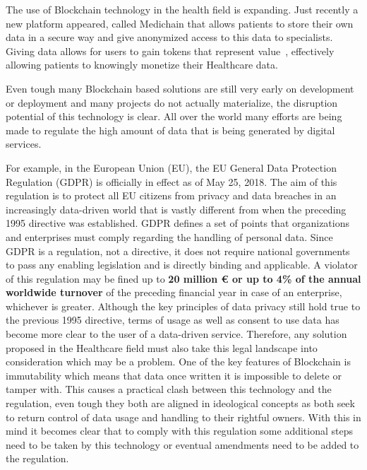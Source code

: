 The use of Blockchain technology in the health field is expanding. Just
recently a new platform appeared, called Medichain that allows patients to
store their own data in a secure way and give anonymized access to this data to
specialists. Giving data allows for users to gain tokens that represent
value~\cite{MediChain2018}, effectively allowing patients to knowingly monetize
their Healthcare data.

Even tough many Blockchain based solutions are still very early on development
or deployment and many projects do not actually materialize, the disruption
potential of this technology is clear. All over the world many efforts are
being made to regulate the high amount of data that is being generated by
digital services.

For example, in the European Union (EU), the EU General Data Protection
Regulation (GDPR) is officially in effect as of May 25, 2018. The aim of this
regulation is to protect all EU citizens from privacy and data breaches in an
increasingly data-driven world that is vastly different from when the preceding
1995 directive was established. GDPR defines a set of points that organizations
and enterprises must comply regarding the handling of personal data. Since GDPR
is a regulation, not a directive, it does not require national governments to
pass any enabling legislation and is directly binding and applicable. A
violator of this regulation may be fined up to \textbf{20 million € or up to
	4\% of the annual worldwide turnover} of the preceding financial year in case
of an enterprise, whichever is greater. Although the key principles of data
privacy still hold true to the previous 1995 directive, terms of usage as well
as consent to use data has become more clear to the user of a data-driven
service.  Therefore, any solution proposed in the Healthcare field must also
take this legal landscape into consideration which may be a problem. One of the
key features of Blockchain is immutability which means that data once written
it is impossible to delete or tamper with. This causes a practical clash
between this technology and the regulation, even tough they both are aligned in
ideological concepts as both seek to return control of data usage and handling
to their rightful owners. With this in mind it becomes clear that to comply
with this regulation some additional steps need to be taken by this technology
or eventual amendments need to be added to the regulation.